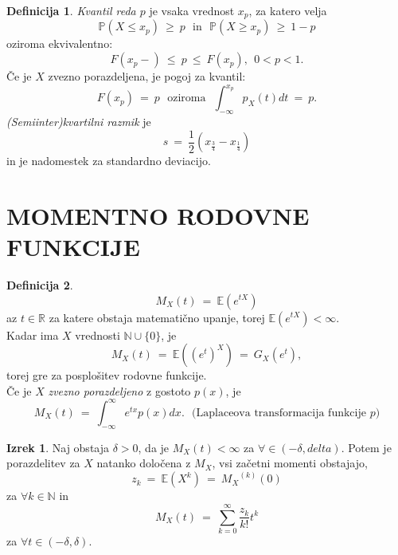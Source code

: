 \documentclass[11pt]{article}
\theoremstyle{definition}
\newtheorem{definicija}{Definicija}[section]
\theoremstyle{definition}
\theoremstyle{definition}
\newtheorem{izrek}{Izrek}[section]
\begin{document}
\begin{definicija}

\textit{Kvantil reda $p$} je vsaka vrednost $x_p$, za katero velja
$$\mathbb{P}(X \leq x_p) ~\geq~ p ~~~\text{in}~~~ \mathbb{P}(X \geq x_p) ~\geq~ 1 - p$$
oziroma ekvivalentno:
$$F(x_p-) ~\leq~ p ~\leq~ F(x_p), ~~0 < p < 1.$$
Če je $X$ zvezno porazdeljena, je pogoj za kvantil:
$$F(x_p) ~=~ p ~~~\text{oziroma}~~~ \int_{-\infty}^{x_p} p_X(t) dt ~=~ p.$$
\textit{(Semiinter)kvartilni razmik} je
$$s ~=~ \frac{1}{2}(x_{\frac{3}{4}} - x_{\frac{1}{4}})$$
in je nadomestek za standardno deviacijo.

\end{definicija}
\vspace{0.5cm}


\section{MOMENTNO RODOVNE FUNKCIJE}
\vspace{0.5cm}

\begin{definicija}

$$M_X(t) ~=~ \mathbb{E}(e^{tX})$$
az $t \in \mathbb{R}$ za katere obstaja matematično upanje, torej $\mathbb{E}(e^{tX}) < \infty$. \\

\noindent Kadar ima $X$ vrednosti $\mathbb{N} \cup \{0\}$, je
$$M_X(t) ~=~ \mathbb{E}((e^t)^X) ~=~ G_X(e^t),$$
torej gre za posplošitev rodovne funkcije. \\

\noindent Če je $X$ \textit{zvezno porazdeljeno} z gostoto $p(x)$, je
$$M_X(t) ~=~ \int_{-\infty}^{\infty} e^{tx} p(x) dx. ~~~\text{(Laplaceova transformacija funkcije $p$)}$$

\end{definicija}
\vspace{0.5cm}

\begin{izrek}

Naj obstaja $\delta > 0$, da je $M_X(t) < \infty$ za $\forall \in (-\delta, delta)$. Potem je porazdelitev za $X$ natanko določena z $M_X$, vsi začetni momenti obstajajo,
$$z_k ~=~ \mathbb{E}(X^k) ~=~ {M_X}^{(k)}(0)$$
za $\forall k \in \mathbb{N}$ in
$$M_X(t) ~=~ \sum_{k=0}^{\infty} \frac{z_k}{k!} t^k$$
za $\forall t \in (-\delta, \delta)$.

\end{izrek}
\vspace{0.5cm}

\end{document}
